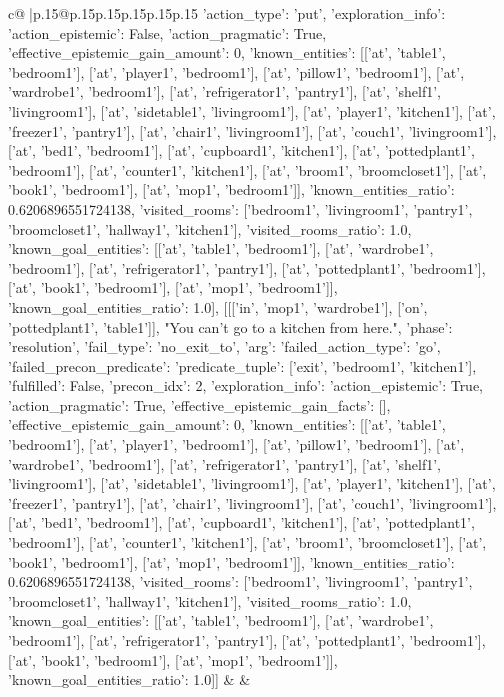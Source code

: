 \documentclass{article}
\begin{document}
{\begin{supertabular}{c@{$\;$}|p{.15\linewidth}@{}p{.15\linewidth}p{.15\linewidth}p{.15\linewidth}p{.15\linewidth}p{.15\linewidth}}
{{{{'action_type': 'put', 'exploration_info': {'action_epistemic': False, 'action_pragmatic': True, 'effective_epistemic_gain_amount': 0, 'known_entities': [['at', 'table1', 'bedroom1'], ['at', 'player1', 'bedroom1'], ['at', 'pillow1', 'bedroom1'], ['at', 'wardrobe1', 'bedroom1'], ['at', 'refrigerator1', 'pantry1'], ['at', 'shelf1', 'livingroom1'], ['at', 'sidetable1', 'livingroom1'], ['at', 'player1', 'kitchen1'], ['at', 'freezer1', 'pantry1'], ['at', 'chair1', 'livingroom1'], ['at', 'couch1', 'livingroom1'], ['at', 'bed1', 'bedroom1'], ['at', 'cupboard1', 'kitchen1'], ['at', 'pottedplant1', 'bedroom1'], ['at', 'counter1', 'kitchen1'], ['at', 'broom1', 'broomcloset1'], ['at', 'book1', 'bedroom1'], ['at', 'mop1', 'bedroom1']], 'known_entities_ratio': 0.6206896551724138, 'visited_rooms': ['bedroom1', 'livingroom1', 'pantry1', 'broomcloset1', 'hallway1', 'kitchen1'], 'visited_rooms_ratio': 1.0, 'known_goal_entities': [['at', 'table1', 'bedroom1'], ['at', 'wardrobe1', 'bedroom1'], ['at', 'refrigerator1', 'pantry1'], ['at', 'pottedplant1', 'bedroom1'], ['at', 'book1', 'bedroom1'], ['at', 'mop1', 'bedroom1']], 'known_goal_entities_ratio': 1.0}}], [[['in', 'mop1', 'wardrobe1'], ['on', 'pottedplant1', 'table1']], "You can't go to a kitchen from here.", {'phase': 'resolution', 'fail_type': 'no_exit_to', 'arg': {'failed_action_type': 'go', 'failed_precon_predicate': {'predicate_tuple': ['exit', 'bedroom1', 'kitchen1'], 'fulfilled': False, 'precon_idx': 2}}, 'exploration_info': {'action_epistemic': True, 'action_pragmatic': True, 'effective_epistemic_gain_facts': [], 'effective_epistemic_gain_amount': 0, 'known_entities': [['at', 'table1', 'bedroom1'], ['at', 'player1', 'bedroom1'], ['at', 'pillow1', 'bedroom1'], ['at', 'wardrobe1', 'bedroom1'], ['at', 'refrigerator1', 'pantry1'], ['at', 'shelf1', 'livingroom1'], ['at', 'sidetable1', 'livingroom1'], ['at', 'player1', 'kitchen1'], ['at', 'freezer1', 'pantry1'], ['at', 'chair1', 'livingroom1'], ['at', 'couch1', 'livingroom1'], ['at', 'bed1', 'bedroom1'], ['at', 'cupboard1', 'kitchen1'], ['at', 'pottedplant1', 'bedroom1'], ['at', 'counter1', 'kitchen1'], ['at', 'broom1', 'broomcloset1'], ['at', 'book1', 'bedroom1'], ['at', 'mop1', 'bedroom1']], 'known_entities_ratio': 0.6206896551724138, 'visited_rooms': ['bedroom1', 'livingroom1', 'pantry1', 'broomcloset1', 'hallway1', 'kitchen1'], 'visited_rooms_ratio': 1.0, 'known_goal_entities': [['at', 'table1', 'bedroom1'], ['at', 'wardrobe1', 'bedroom1'], ['at', 'refrigerator1', 'pantry1'], ['at', 'pottedplant1', 'bedroom1'], ['at', 'book1', 'bedroom1'], ['at', 'mop1', 'bedroom1']], 'known_goal_entities_ratio': 1.0}}]] 
	  } 
	   } 
	   } 
	 & & \\ 
 


\end{supertabular}}
\end{document}
